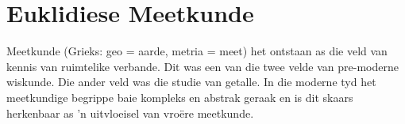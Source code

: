 \chapter{Euklidiese Meetkunde}
\setcounter{figure}{1}
\setcounter{subfigure}{1}

Meetkunde (Grieks: geo = aarde, metria = meet) het ontstaan as die veld van kennis van ruimtelike verbande.
Dit was een van die twee velde van pre-moderne wiskunde. Die ander veld was die studie van getalle. In
die moderne tyd het meetkundige begrippe baie kompleks en abstrak geraak en is dit skaars herkenbaar as ’n
uitvloeisel van vroëre meetkunde.\par 




